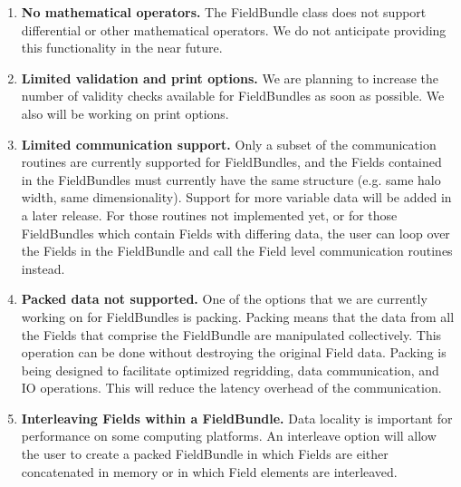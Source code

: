 
\label{sec:bundlerest}

\begin{enumerate}
\item{\bf No mathematical operators.}
The FieldBundle class does not support differential or other
mathematical operators.  We do not anticipate providing this 
functionality in the near future.

\item{\bf Limited validation and print options.}
We are planning to increase the number of validity checks available
for FieldBundles as soon as possible.  We also will
be working on print options.

\item{\bf Limited communication support.}
Only a subset of the communication routines are currently supported
for FieldBundles, and the Fields contained in the FieldBundles must currently
have the same structure (e.g. same halo width, same dimensionality). 
Support for more variable data will be added in a later release.
For those routines not implemented yet, or for those FieldBundles which
contain Fields with differing data, the user can loop over the Fields 
in the FieldBundle and call the Field level communication routines instead.

\item{\bf Packed data not supported.}
One of the options that we are currently working on for FieldBundles is
packing.  Packing means that the data from all the
Fields that comprise the FieldBundle are manipulated collectively.
This operation can be done without 
destroying the original Field data.  Packing is being designed to 
facilitate optimized regridding, data communication, and IO operations.  
This will reduce the latency overhead of the communication.  

\item{\bf Interleaving Fields within a FieldBundle.}
Data locality is important for performance on some computing
platforms.  An interleave option will allow the user to create
a packed FieldBundle in which Fields are either concatenated in memory
or in which Field elements are interleaved.

\end{enumerate}




